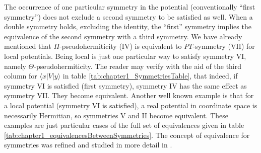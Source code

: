 The occurrence of one particular symmetry in the potential (conventionally  ``first symmetry'')
does not exclude a second symmetry to be satisfied as well.
When a double symmetry holds, excluding the identity,  the ``first'' symmetry  implies the equivalence of the second symmetry with a third symmetry.
We have already mentioned that $\Pi$-pseudohermiticity (IV) is equivalent to $PT$-symmetry (VII) for local potentials.
Being local is just one particular way to satisfy symmetry VI, namely $\Theta$-pseudohermiticity. The reader may verify with the aid of
the third column for $\langle x|V|y\rangle$  in table \ref{tab:chapter1_SymmetriesTable}, that indeed, if symmetry VI is satisfied (first symmetry), symmetry IV has the same effect as symmetry VII.
They become equivalent. Another well known example is  that for a local potential (symmetry VI is satisfied), a real potential in coordinate space  is necessarily Hermitian,
so symmetries V and II become equivalent.
These examples are just particular cases of the full set of equivalences given in table \ref{tab:chapter1_equivalencesBetweenSymmetries}. The concept of equivalence for symmetries was refined and studied in more detail in \cite{Alana2020}.

\begin{table}
  \caption{Equivalences among symmetries for the potential elements.
  Given the symmetry of the upper row, the table provides the equivalent symmetries.
  For example, if II is satisfied, then III=IV holds. In words, if the potential is Hermitian,  parity symmetry amounts to
  parity pseudohermiticity. In terms of the matrix elements of the potential, if  $\langle x|V|y\rangle=\langle y|V|x\rangle^*$ and also
  $\langle x|V|y\rangle=\langle -x|V|-y\rangle$, $\forall (x,y)$, then $\langle x|V|y\rangle=\langle -y|V|-x\rangle^*$ holds as well. One may proceed similarly for all other relations.
  The commutation with the identity (I) is excluded as this symmetry is satisfied by all potentials.\vspace*{.2cm}
  \label{tab:chapter1_equivalencesBetweenSymmetries}}
  \centering

\end{table}



